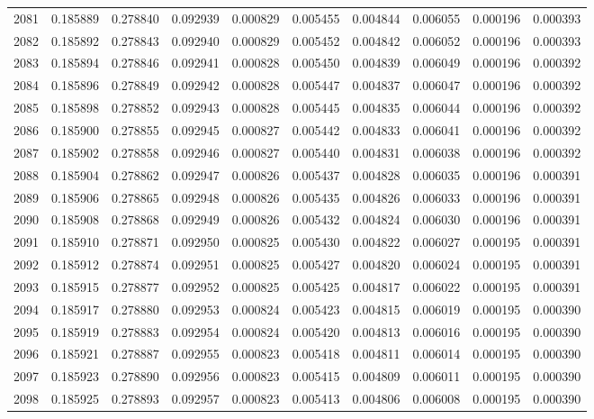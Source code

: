 \begin{tabular}{lrrrrrrrrr}
2081 & 0.185889 & 0.278840 & 0.092939 & 0.000829 & 0.005455 & 0.004844 & 0.006055 & 0.000196 & 0.000393 \\
2082 & 0.185892 & 0.278843 & 0.092940 & 0.000829 & 0.005452 & 0.004842 & 0.006052 & 0.000196 & 0.000393 \\
2083 & 0.185894 & 0.278846 & 0.092941 & 0.000828 & 0.005450 & 0.004839 & 0.006049 & 0.000196 & 0.000392 \\
2084 & 0.185896 & 0.278849 & 0.092942 & 0.000828 & 0.005447 & 0.004837 & 0.006047 & 0.000196 & 0.000392 \\
2085 & 0.185898 & 0.278852 & 0.092943 & 0.000828 & 0.005445 & 0.004835 & 0.006044 & 0.000196 & 0.000392 \\
2086 & 0.185900 & 0.278855 & 0.092945 & 0.000827 & 0.005442 & 0.004833 & 0.006041 & 0.000196 & 0.000392 \\
2087 & 0.185902 & 0.278858 & 0.092946 & 0.000827 & 0.005440 & 0.004831 & 0.006038 & 0.000196 & 0.000392 \\
2088 & 0.185904 & 0.278862 & 0.092947 & 0.000826 & 0.005437 & 0.004828 & 0.006035 & 0.000196 & 0.000391 \\
2089 & 0.185906 & 0.278865 & 0.092948 & 0.000826 & 0.005435 & 0.004826 & 0.006033 & 0.000196 & 0.000391 \\
2090 & 0.185908 & 0.278868 & 0.092949 & 0.000826 & 0.005432 & 0.004824 & 0.006030 & 0.000196 & 0.000391 \\
2091 & 0.185910 & 0.278871 & 0.092950 & 0.000825 & 0.005430 & 0.004822 & 0.006027 & 0.000195 & 0.000391 \\
2092 & 0.185912 & 0.278874 & 0.092951 & 0.000825 & 0.005427 & 0.004820 & 0.006024 & 0.000195 & 0.000391 \\
2093 & 0.185915 & 0.278877 & 0.092952 & 0.000825 & 0.005425 & 0.004817 & 0.006022 & 0.000195 & 0.000391 \\
2094 & 0.185917 & 0.278880 & 0.092953 & 0.000824 & 0.005423 & 0.004815 & 0.006019 & 0.000195 & 0.000390 \\
2095 & 0.185919 & 0.278883 & 0.092954 & 0.000824 & 0.005420 & 0.004813 & 0.006016 & 0.000195 & 0.000390 \\
2096 & 0.185921 & 0.278887 & 0.092955 & 0.000823 & 0.005418 & 0.004811 & 0.006014 & 0.000195 & 0.000390 \\
2097 & 0.185923 & 0.278890 & 0.092956 & 0.000823 & 0.005415 & 0.004809 & 0.006011 & 0.000195 & 0.000390 \\
2098 & 0.185925 & 0.278893 & 0.092957 & 0.000823 & 0.005413 & 0.004806 & 0.006008 & 0.000195 & 0.000390 \\

\end{tabular}
